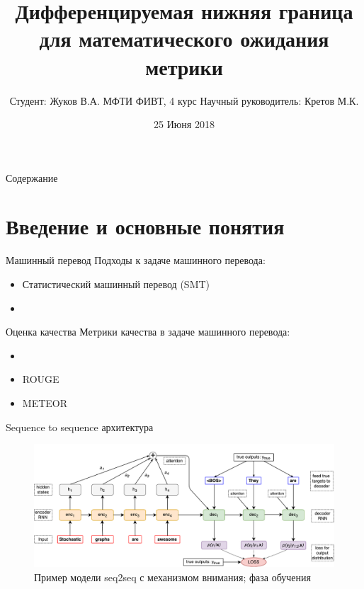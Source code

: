 \documentclass{beamer}					%
\title{Дифференцируемая нижняя граница для математического ожидания метрики \color{blue}{BLEU}}	%
\author{
        Студент: Жуков В.А. МФТИ ФИВТ, 4 курс
        \vfill
        Научный руководитель: Кретов М.К.
    }
\date{25 Июня 2018}
\begin{document}
    
    \begin{frame}
      \titlepage
    \end{frame}
    
    \begin{frame}{Содержание}
      \tableofcontents
    \end{frame}
    
    
    \section{Введение и основные понятия}
    
    \begin{frame}{Машинный перевод}
        Подходы к задаче машинного перевода:
        \begin{itemize}
            \item Статистический машинный перевод (SMT)
            \item \color{blue}{Нейронный машинный перевод (NMT)}
        \end{itemize}
    \end{frame}
    

    \begin{frame}{Оценка качества}
        Метрики качества в задаче машинного перевода:
        \begin{itemize}
            \item {\color{blue}{BLEU}}
            \item ROUGE
            \item METEOR
        \end{itemize}
    \end{frame}

    \begin{frame}{Sequence to sequence архитектура}
        \begin{figure}
            \centering
            \includegraphics[width=1.0\linewidth]{seq2seq.pdf}
            \caption{Пример модели seq2seq с механизмом внимания; фаза обучения}
            \label{fig:seq2seq}
        \end{figure}
    \end{frame}
\end{document}
